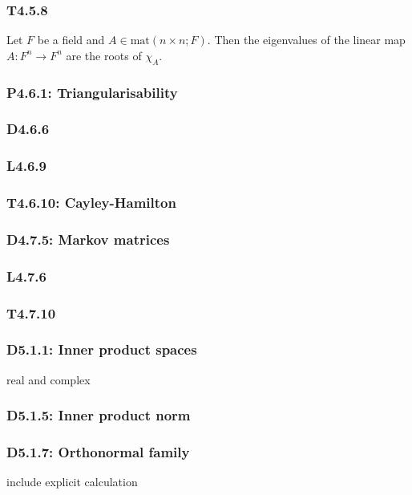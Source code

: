 \documentclass{article}
\begin{document}
\begin{multicols*}{3}
\subsubsection*{T4.5.8}
Let $F$ be a field and $A\in\text{mat}(n\times n;F)$. Then the
eigenvalues of the linear map $A:F^n\rightarrow F^n$ are the
roots of $\chi_A$.

\subsubsection*{P4.6.1: Triangularisability}

\subsubsection*{D4.6.6}

\subsubsection*{L4.6.9}

\subsubsection*{T4.6.10: Cayley-Hamilton}

\subsubsection*{D4.7.5: Markov matrices}

\subsubsection*{L4.7.6}

\subsubsection*{T4.7.10}

\newcolumn

\subsubsection*{D5.1.1: Inner product spaces}
real and complex

\subsubsection*{D5.1.5: Inner product norm}

\subsubsection*{D5.1.7: Orthonormal family}
include explicit calculation


\end{multicols*}
\end{document}
